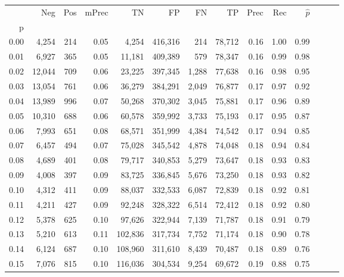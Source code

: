 \begin{tabular}{rrrrrrrrrrrrrr}
\toprule
{} &     Neg &    Pos & mPrec &       TN &       FP &      FN &      TP &  Prec &   Rec & $\hat{p}$ \\
p    &         &        &       &          &          &         &         &       &       &           \\
\midrule
0.00 &   4,254 &    214 &  0.05 &    4,254 &  416,316 &     214 &  78,712 &  0.16 &  1.00 &      0.99 \\
0.01 &   6,927 &    365 &  0.05 &   11,181 &  409,389 &     579 &  78,347 &  0.16 &  0.99 &      0.98 \\
0.02 &  12,044 &    709 &  0.06 &   23,225 &  397,345 &   1,288 &  77,638 &  0.16 &  0.98 &      0.95 \\
0.03 &  13,054 &    761 &  0.06 &   36,279 &  384,291 &   2,049 &  76,877 &  0.17 &  0.97 &      0.92 \\
0.04 &  13,989 &    996 &  0.07 &   50,268 &  370,302 &   3,045 &  75,881 &  0.17 &  0.96 &      0.89 \\
0.05 &  10,310 &    688 &  0.06 &   60,578 &  359,992 &   3,733 &  75,193 &  0.17 &  0.95 &      0.87 \\
0.06 &   7,993 &    651 &  0.08 &   68,571 &  351,999 &   4,384 &  74,542 &  0.17 &  0.94 &      0.85 \\
0.07 &   6,457 &    494 &  0.07 &   75,028 &  345,542 &   4,878 &  74,048 &  0.18 &  0.94 &      0.84 \\
0.08 &   4,689 &    401 &  0.08 &   79,717 &  340,853 &   5,279 &  73,647 &  0.18 &  0.93 &      0.83 \\
0.09 &   4,008 &    397 &  0.09 &   83,725 &  336,845 &   5,676 &  73,250 &  0.18 &  0.93 &      0.82 \\
0.10 &   4,312 &    411 &  0.09 &   88,037 &  332,533 &   6,087 &  72,839 &  0.18 &  0.92 &      0.81 \\
0.11 &   4,211 &    427 &  0.09 &   92,248 &  328,322 &   6,514 &  72,412 &  0.18 &  0.92 &      0.80 \\
0.12 &   5,378 &    625 &  0.10 &   97,626 &  322,944 &   7,139 &  71,787 &  0.18 &  0.91 &      0.79 \\
0.13 &   5,210 &    613 &  0.11 &  102,836 &  317,734 &   7,752 &  71,174 &  0.18 &  0.90 &      0.78 \\
0.14 &   6,124 &    687 &  0.10 &  108,960 &  311,610 &   8,439 &  70,487 &  0.18 &  0.89 &      0.76 \\
0.15 &   7,076 &    815 &  0.10 &  116,036 &  304,534 &   9,254 &  69,672 &  0.19 &  0.88 &      0.75 \\

\end{tabular}
